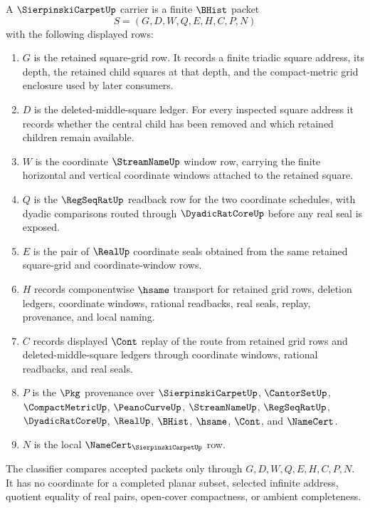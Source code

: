 \begin{definition}
\label{def:sierpinski-carpet-carrier}
A $\SierpinskiCarpetUp$ carrier is a finite $\BHist$ packet
$$
S=(G,D,W,Q,E,H,C,P,N)
$$
with the following displayed rows:
\begin{enumerate}
\item $G$ is the retained square-grid row. It records a finite triadic square address, its depth, the retained child squares at that depth, and the compact-metric grid enclosure used by later consumers.
\item $D$ is the deleted-middle-square ledger. For every inspected square address it records whether the central child has been removed and which retained children remain available.
\item $W$ is the coordinate $\StreamNameUp$ window row, carrying the finite horizontal and vertical coordinate windows attached to the retained square.
\item $Q$ is the $\RegSeqRatUp$ readback row for the two coordinate schedules, with dyadic comparisons routed through $\DyadicRatCoreUp$ before any real seal is exposed.
\item $E$ is the pair of $\RealUp$ coordinate seals obtained from the same retained square-grid and coordinate-window rows.
\item $H$ records componentwise $\hsame$ transport for retained grid rows, deletion ledgers, coordinate windows, rational readbacks, real seals, replay, provenance, and local naming.
\item $C$ records displayed $\Cont$ replay of the route from retained grid rows and deleted-middle-square ledgers through coordinate windows, rational readbacks, and real seals.
\item $P$ is the $\Pkg$ provenance over $\SierpinskiCarpetUp$, $\CantorSetUp$, $\CompactMetricUp$, $\PeanoCurveUp$, $\StreamNameUp$, $\RegSeqRatUp$, $\DyadicRatCoreUp$, $\RealUp$, $\BHist$, $\hsame$, $\Cont$, and $\NameCert$.
\item $N$ is the local $\NameCert_{\SierpinskiCarpetUp}$ row.
\end{enumerate}
The classifier compares accepted packets only through $G,D,W,Q,E,H,C,P,N$. It has no coordinate for a completed planar subset, selected infinite address, quotient equality of real pairs, open-cover compactness, or ambient completeness.
\end{definition}

